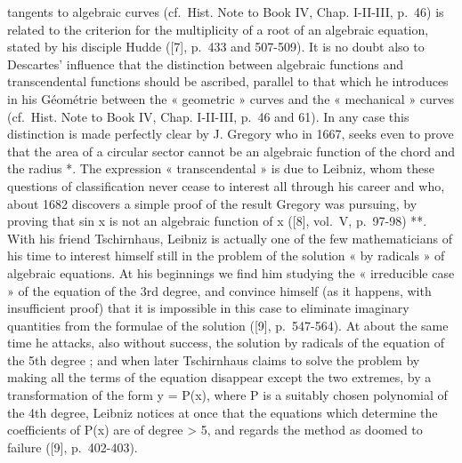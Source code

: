 tangents to algebraic curves (cf.~Hist. Note to Book IV, Chap. I-II-III, p.~46) is related to the criterion for the multiplicity of a root of an algebraic equation, stated by his disciple Hudde ({[}7{]}, p.~433 and 507-509). It is no doubt also to Descartes' influence that the distinction between algebraic functions and transcendental functions should be ascribed, parallel to that which he introduces in his Géométrie between the « geometric » curves and the « mechanical » curves (cf.~Hist. Note to Book IV, Chap. I-II-III, p.~46 and 61). In any case this distinction is made perfectly clear by J. Gregory who in 1667, seeks even to prove that the area of a circular sector cannot be an algebraic function of the chord and the radius *. The expression « transcendental » is due to Leibniz, whom these questions of classification never cease to interest all through his career and who, about 1682 discovers a simple proof of the result Gregory was pursuing, by proving that sin x is not an algebraic function of x ({[}8{]}, vol.~V, p.~97-98) **. With his friend Tschirnhaus, Leibniz is actually one of the few mathematicians of his time to interest himself still in the problem of the solution « by radicals » of algebraic equations. At his beginnings we find him studying the « irreducible case » of the equation of the 3rd degree, and convince himself (as it happens, with insufficient proof) that it is impossible in this case to eliminate imaginary quantities from the formulae of the solution ({[}9{]}, p.~547-564). At about the same time he attacks, also without success, the solution by radicals of the equation of the 5th degree ; and when later Tschirnhaus claims to solve the problem by making all the terms of the equation disappear except the two extremes, by a transformation of the form y = P(x), where P is a suitably chosen polynomial of the 4th degree, Leibniz notices at once that the equations which determine the coefficients of P(x) are of degree \textgreater{} 5, and regards the method as doomed to failure ({[}9{]}, p.~402-403).

